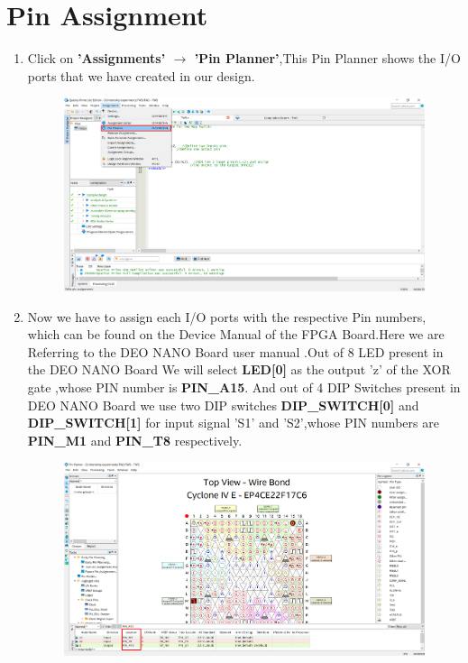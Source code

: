 \documentclass[12pt]{article}
\begin{document}
\section{Pin  Assignment}
\begin{enumerate}
    \item Click on \textbf{'Assignments' $\rightarrow$ 'Pin Planner'},This Pin Planner shows the I/O ports that we have created in our design.
    \begin{figure}[H]
        \centering
        \includegraphics[scale=0.35]{twsplan1.png}
    \end{figure}

    \item Now we have to assign each I/O ports with the respective Pin numbers, which can be found on the Device Manual of the FPGA Board.Here we are Referring to the DEO NANO Board user manual .Out of 8 LED present in the DEO NANO Board We will select \textbf{LED[0]} as the output 'z' of the XOR gate ,whose PIN number is \textbf{PIN\_A15}. And out of 4 DIP Switches present in DEO NANO Board we use two DIP switches \textbf{DIP\_SWITCH[0]} and \textbf{DIP\_SWITCH[1]} for input signal 'S1' and 'S2',whose PIN numbers are \textbf{PIN\_M1} and \textbf{PIN\_T8} respectively.
    \newpage
     \begin{figure}[H]
        \centering
        \includegraphics[scale=0.35 ]{TWSPLAN2.png}
    \end{figure}


\end{enumerate}
\end{document}

